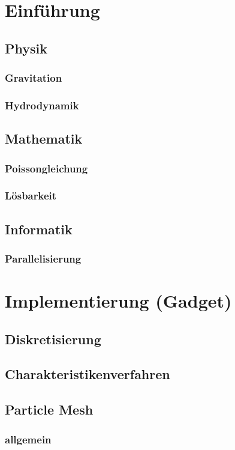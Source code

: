 \documentclass{scrartcl}
\begin{document}
\section{Einführung}
\subsection{Physik}
\subsubsection{Gravitation}
\subsubsection{Hydrodynamik}
\subsection{Mathematik}
\subsubsection{Poissongleichung}
\subsubsection{Lösbarkeit}
\subsection{Informatik}
\subsubsection{Parallelisierung}

\section{Implementierung (Gadget)}
\subsection{Diskretisierung}
\subsection{Charakteristikenverfahren}
\subsection{Particle Mesh}
\subsubsection{allgemein}
\end{document}
